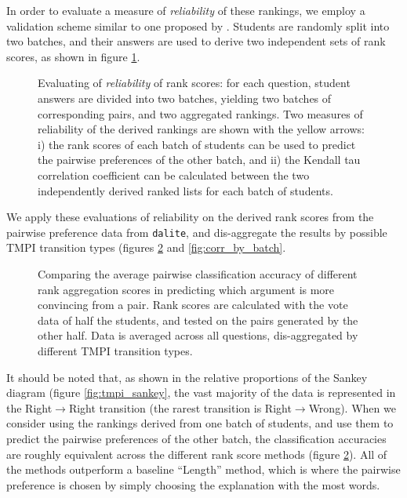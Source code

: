 \documentclass[notitlepage,12pt]{jedm}
\begin{document}
In order to evaluate a measure of \textit{reliability} of these rankings, we 
employ a validation scheme similar to one proposed by \cite{jones_peer_2015}.
Students are randomly split into two batches, and their answers are used to 
derive two independent sets of rank scores, as shown in figure 
\ref{fig:evaluate_rankings}. 


\begin{figure}[H]
	\centering
	\scalebox{0.5}{}
	\caption{
		Evaluating of \textit{reliability} of rank scores: for each question, 
		student answers are divided into two batches, yielding two batches of 
		corresponding pairs, and two aggregated rankings.
		Two measures of reliability of the derived rankings are shown with the 
		yellow arrows: 
		i) the rank scores of each batch of students can be used to predict the 
		pairwise preferences of the other batch, and 
		ii) the Kendall tau correlation coefficient can be calculated between 
		the two independently derived ranked lists for each batch of students. 
	}
	\label{fig:evaluate_rankings}
\end{figure}

We apply these evaluations of reliability on the derived rank scores from the 
pairwise preference data from \verb|dalite|, and dis-aggregate the results by 
possible TMPI transition types (figures \ref{fig:acc_by_batch} and 
\ref{fig:corr_by_batch}.

\begin{figure}[H]
	\centering
	\scalebox{0.6}{}
	\caption{
		Comparing the average pairwise classification accuracy of different 
		rank aggregation scores in predicting which argument is more convincing 
		from a pair. 
		Rank scores are calculated with the vote data of half the students, and 
		tested on the pairs generated by the other half. 
		Data is averaged across all questions, dis-aggregated by different TMPI 
		transition types. 
	}
	\label{fig:acc_by_batch}
\end{figure}

It should be noted that, as shown in the relative proportions of the Sankey 
diagram (figure \ref{fig:tmpi_sankey}, the vast majority of the data is 
represented in the Right$\rightarrow$Right transition (the rarest transition is 
Right$\rightarrow$Wrong).
When we consider using the rankings derived from one batch of students, and use 
them to predict the pairwise preferences of the other batch, the classification 
accuracies are roughly equivalent across the different rank score methods 
(figure \ref{fig:acc_by_batch}).
All of the methods outperform a baseline ``Length'' method, which is where the 
pairwise preference is chosen by simply choosing the explanation with the most 
words.
\end{document}
